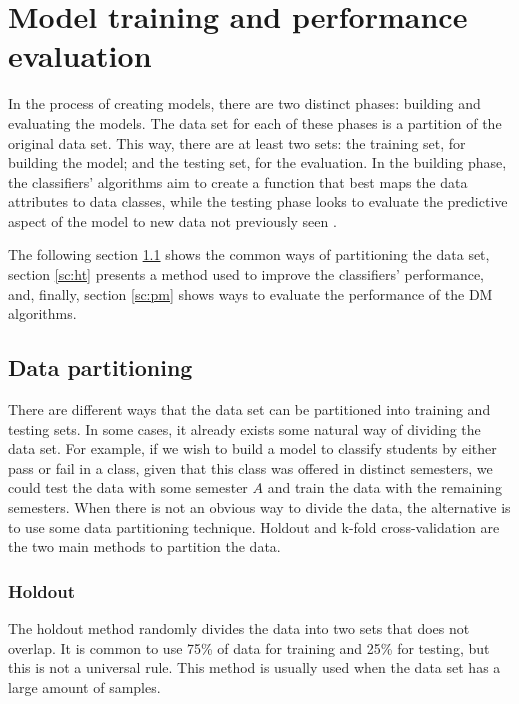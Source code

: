 \section{Model training and performance evaluation}
\label{sc:training}

In the process of creating models, there are two distinct phases: building and evaluating the models. The data set for each of these phases is a partition of the original data set. This way, there are at least two sets: the training set, for building the model; and the testing set, for the evaluation. In the building phase, the classifiers' algorithms aim to create a function that best maps the data attributes to data classes, while the testing phase looks to evaluate the predictive aspect of the model to new data not previously seen \cite{cechinel2020mineraccao}.

The following section \ref{sc:dp} shows the common ways of partitioning the data set, section \ref{sc:ht} presents a method used to improve the classifiers' performance, and, finally, section \ref{sc:pm} shows ways to evaluate the performance of the DM algorithms.

\subsection{Data partitioning}
\label{sc:dp}

There are different ways that the data set can be partitioned into training and testing sets. In some cases, it already exists some natural way of dividing the data set. For example, if we wish to build a model to classify students by either pass or fail in a class, given that this class was offered in distinct semesters, we could test the data with some semester $A$ and train the data with the remaining semesters. When there is not an obvious way to divide the data, the alternative is to use some data partitioning technique. Holdout and k-fold cross-validation are the two main methods to partition the data.

\subsubsection{Holdout}

The holdout method randomly divides the data into two sets that does not overlap. It is common to use 75\% of data for training and 25\% for testing, but this is not a universal rule. This method is usually used when the data set has a large amount of samples.


